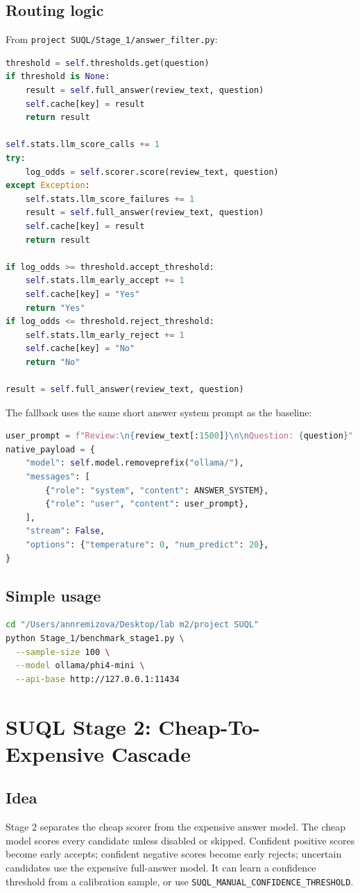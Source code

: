 \documentclass[11pt,oneside]{book}
\begin{document}
\section{Routing logic}
From \texttt{project SUQL/Stage\_1/answer\_filter.py}:
\begin{lstlisting}[language=Python]
threshold = self.thresholds.get(question)
if threshold is None:
    result = self.full_answer(review_text, question)
    self.cache[key] = result
    return result

self.stats.llm_score_calls += 1
try:
    log_odds = self.scorer.score(review_text, question)
except Exception:
    self.stats.llm_score_failures += 1
    result = self.full_answer(review_text, question)
    self.cache[key] = result
    return result

if log_odds >= threshold.accept_threshold:
    self.stats.llm_early_accept += 1
    self.cache[key] = "Yes"
    return "Yes"
if log_odds <= threshold.reject_threshold:
    self.stats.llm_early_reject += 1
    self.cache[key] = "No"
    return "No"

result = self.full_answer(review_text, question)
\end{lstlisting}
The fallback uses the same short answer system prompt as the baseline:
\begin{lstlisting}[language=Python]
user_prompt = f"Review:\n{review_text[:1500]}\n\nQuestion: {question}"
native_payload = {
    "model": self.model.removeprefix("ollama/"),
    "messages": [
        {"role": "system", "content": ANSWER_SYSTEM},
        {"role": "user", "content": user_prompt},
    ],
    "stream": False,
    "options": {"temperature": 0, "num_predict": 20},
}
\end{lstlisting}
\section{Simple usage}
\begin{lstlisting}[language=bash]
cd "/Users/annremizova/Desktop/lab m2/project SUQL"
python Stage_1/benchmark_stage1.py \
  --sample-size 100 \
  --model ollama/phi4-mini \
  --api-base http://127.0.0.1:11434
\end{lstlisting}
\chapter{SUQL Stage 2: Cheap-To-Expensive Cascade}
\section{Idea}
Stage 2 separates the cheap scorer from the expensive answer model. The cheap model scores every candidate unless disabled or skipped. Confident positive scores become early accepts; confident negative scores become early rejects; uncertain candidates use the expensive full-answer model.
It can learn a confidence threshold from a calibration sample, or use \texttt{SUQL\_MANUAL\_CONFIDENCE\_THRESHOLD}.
\end{document}

